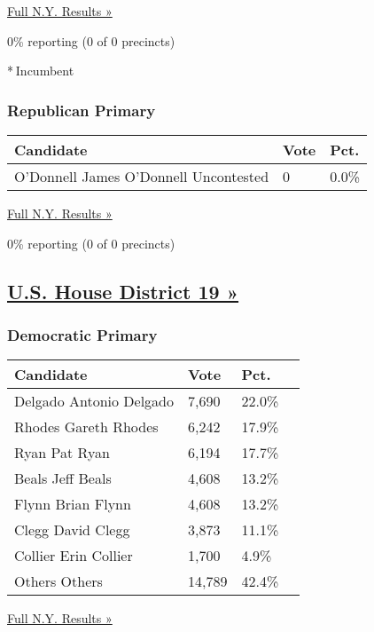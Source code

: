 \href{https://www.nytimes3xbfgragh.onion/elections/results/new-york}{Full
N.Y. Results »}

0\% reporting (0 of 0 precincts)

* Incumbent

\hypertarget{republican-primary-12}{%
\subsubsection{Republican Primary}\label{republican-primary-12}}

\begin{longtable}[]{@{}lll@{}}
\toprule
Candidate & Vote & Pct.\tabularnewline
\midrule
\endhead
 O'Donnell James O'Donnell Uncontested & 0 & 0.0\%\tabularnewline
\bottomrule
\end{longtable}

\href{https://www.nytimes3xbfgragh.onion/elections/results/new-york}{Full
N.Y. Results »}

0\% reporting (0 of 0 precincts)

\hypertarget{us-house-district-19-}{%
\subsection{\texorpdfstring{\href{https://www.nytimes3xbfgragh.onion/elections/results/new-york-house-district-19-primary-election}{U.S.
House District 19
»}}{U.S. House District 19 »}}\label{us-house-district-19-}}

\hypertarget{democratic-primary-19}{%
\subsubsection{Democratic Primary}\label{democratic-primary-19}}

\begin{longtable}[]{@{}llll@{}}
\toprule
Candidate & Vote & Pct. &\tabularnewline
\midrule
\endhead
 Delgado Antonio Delgado & 7,690 & 22.0\% &\tabularnewline
 Rhodes Gareth Rhodes & 6,242 & 17.9\% &\tabularnewline
 Ryan Pat Ryan & 6,194 & 17.7\% &\tabularnewline
 Beals Jeff Beals & 4,608 & 13.2\% &\tabularnewline
 Flynn Brian Flynn & 4,608 & 13.2\% &\tabularnewline
 Clegg David Clegg & 3,873 & 11.1\% &\tabularnewline
 Collier Erin Collier & 1,700 & 4.9\% &\tabularnewline
 Others Others & 14,789 & 42.4\% &\tabularnewline
\bottomrule
\end{longtable}

\href{https://www.nytimes3xbfgragh.onion/elections/results/new-york}{Full
N.Y. Results »}

